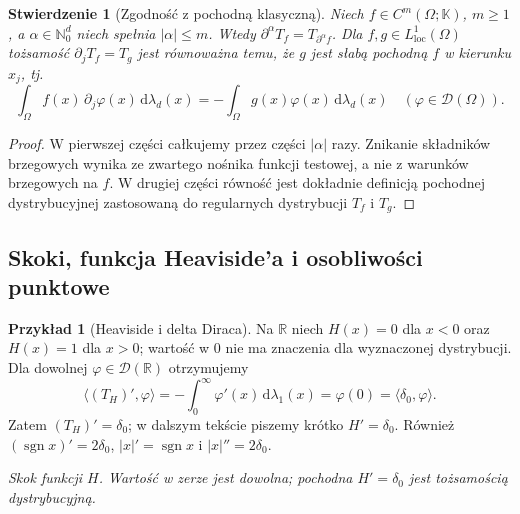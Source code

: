 \documentclass[11pt,a4paper]{article}
\numberwithin{equation}{section}
\theoremstyle{plain}
\newtheorem{stwierdzenie}[twierdzenie]{Stwierdzenie}
\theoremstyle{definition}
\newtheorem{przyklad}[twierdzenie]{Przykład}
\theoremstyle{remark}
\newcommand{\R}{\mathbb R}
\newcommand{\N}{\mathbb N}
\newcommand{\K}{\mathbb K}
\begin{document}
\begin{stwierdzenie}[Zgodność z pochodną klasyczną]
\label{prop:classical-weak20}
Niech $f\in C^m(\Omega;\K)$, $m\ge1$, a $\alpha\in\N_0^d$
niech spełnia $|\alpha|\le m$. Wtedy
$\partial^\alpha T_f=T_{\partial^\alpha f}$.
Dla $f,g\in L^1_{\mathrm{loc}}(\Omega)$ tożsamość
$\partial_jT_f=T_g$ jest równoważna temu, że $g$ jest
\emph{słabą pochodną} $f$ w kierunku $x_j$, tj.
\[
 \int_\Omega f(x)\,\partial_j\varphi(x)\,\mathrm d\lambda_d(x)
 =-\int_\Omega g(x)\varphi(x)\,\mathrm d\lambda_d(x)
 \quad(\varphi\in\mathcal D(\Omega)).
\]
\end{stwierdzenie}
\begin{proof}
W pierwszej części całkujemy przez części $|\alpha|$ razy.
Znikanie składników brzegowych wynika ze zwartego nośnika
funkcji testowej, a nie z warunków brzegowych na $f$.
W drugiej części równość jest dokładnie definicją pochodnej
dystrybucyjnej zastosowaną do regularnych dystrybucji
$T_f$ i $T_g$.
\end{proof}

\subsection{Skoki, funkcja Heaviside'a i osobliwości punktowe}

\begin{przyklad}[Heaviside i delta Diraca]
\label{ex:heaviside20}
Na $\R$ niech $H(x)=0$ dla $x<0$ oraz $H(x)=1$ dla $x>0$;
wartość w $0$ nie ma znaczenia dla wyznaczonej dystrybucji.
Dla dowolnej $\varphi\in\mathcal D(\R)$ otrzymujemy
\[
 \langle (T_H)',\varphi\rangle
 =-\int_0^\infty\varphi'(x)\,\mathrm d\lambda_1(x)
 =\varphi(0)=\langle\delta_0,\varphi\rangle.
\]
Zatem $(T_H)'=\delta_0$; w dalszym tekście piszemy krótko
$H'=\delta_0$. Również $(\operatorname{sgn}x)'=2\delta_0$,
$|x|'=\operatorname{sgn}x$ i $|x|''=2\delta_0$.
\end{przyklad}

\begin{center}

\small\emph{Skok funkcji $H$. Wartość w zerze jest dowolna;
pochodna $H'=\delta_0$ jest tożsamością dystrybucyjną.}
\end{center}
\end{document}
